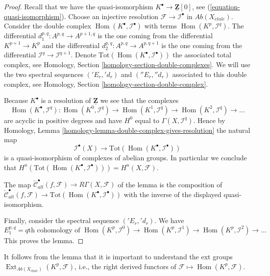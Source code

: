 \documentclass{stacks-project}
\theoremstyle{plain}
\theoremstyle{definition}
\theoremstyle{remark}
\numberwithin{equation}{subsection}
\def\Hom{\mathop{\mathrm{Hom}}\nolimits}
\def\Ext{\mathop{\mathrm{Ext}}\nolimits}
\def\etale{{\acute{e}tale}}
\begin{document}
\begin{proof}
Recall that we have the quasi-isomorphism
$K^\bullet \to \underline{\mathbf{Z}}[0]$, see
(\ref{equation-quasi-isomorphism}).
Choose an injective resolution $\mathcal{F} \to \mathcal{I}^\bullet$
in $\textit{Ab}(X_\etale)$. Consider the double complex
$\Hom(K^\bullet, \mathcal{I}^\bullet)$ with terms
$\Hom(K^p, \mathcal{I}^q)$. The differential
$d_1^{p, q} : A^{p, q} \to A^{p + 1, q}$
is the one coming from the differential $K^{p + 1} \to K^p$
and the differential $d_2^{p, q} : A^{p, q} \to A^{p, q + 1}$ is the
one coming from the differential
$\mathcal{I}^q \to \mathcal{I}^{q + 1}$.
Denote $\text{Tot}(\Hom(K^\bullet, \mathcal{I}^\bullet))$
the associated total complex, see
Homology, Section \ref{homology-section-double-complexes}.
We will use the two spectral
sequences $({}'E_r, {}'d_r)$ and $({}''E_r, {}''d_r)$
associated to this double complex, see
Homology, Section \ref{homology-section-double-complex}.

\medskip\noindent
Because $K^\bullet$ is a resolution of $\underline{\mathbf{Z}}$
we see that the complexes
$$
\Hom(K^\bullet, \mathcal{I}^q) :
\Hom(K^0, \mathcal{I}^q) \to
\Hom(K^1, \mathcal{I}^q) \to
\Hom(K^2, \mathcal{I}^q) \to \ldots
$$
are acyclic in positive degrees and have $H^0$ equal to
$\Gamma(X, \mathcal{I}^q)$. Hence by
Homology, Lemma \ref{homology-lemma-double-complex-gives-resolution}
the natural map
$$
\mathcal{I}^\bullet(X) \longrightarrow
\text{Tot}(\Hom(K^\bullet, \mathcal{I}^\bullet))
$$
is a quasi-isomorphism of complexes of abelian groups. In particular
we conclude that
$H^n(\text{Tot}(\Hom(K^\bullet, \mathcal{I}^\bullet))) = H^n(X, \mathcal{F})$.

\medskip\noindent
The map $\check{\mathcal{C}}^\bullet_{alt}(f, \mathcal{F}) \to
R\Gamma(X, \mathcal{F})$ of the lemma is the composition of
$\check{\mathcal{C}}^\bullet_{alt}(f, \mathcal{F}) \to
\text{Tot}(\Hom(K^\bullet, \mathcal{I}^\bullet))$
with the inverse of the displayed quasi-isomorphism.

\medskip\noindent
Finally, consider the spectral sequence $({}'E_r, {}'d_r)$.
We have
$$
E_1^{p, q} = q\text{th cohomology of }
\Hom(K^p, \mathcal{I}^0) \to
\Hom(K^p, \mathcal{I}^1) \to
\Hom(K^p, \mathcal{I}^2) \to \ldots
$$
This proves the lemma.
\end{proof}

\noindent
It follows from the lemma that it is important to understand the
ext groups $\Ext_{\textit{Ab}(X_\etale)}(K^p, \mathcal{F})$,
i.e., the right derived functors of
$\mathcal{F} \mapsto \Hom(K^p, \mathcal{F})$.
\end{document}
